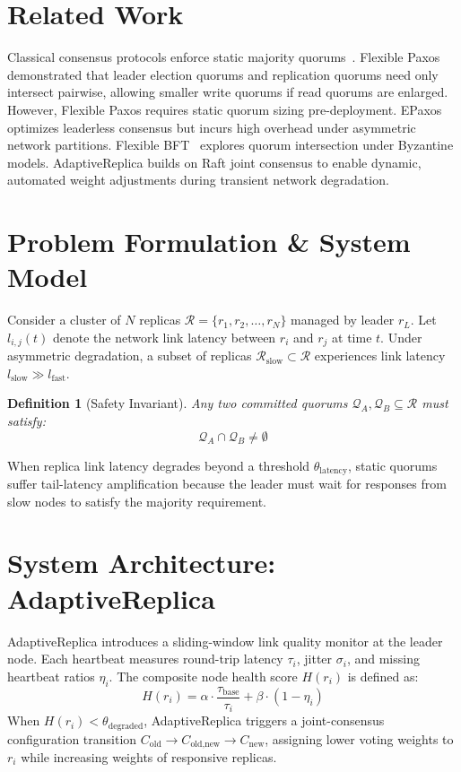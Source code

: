 \documentclass[journal]{IEEEtai}
\newtheorem{definition}{Definition}
\begin{document}
\section{Related Work}
Classical consensus protocols enforce static majority quorums~\cite{lamport1998part, ongaro2014search}. Flexible Paxos~\cite{howard2016flexible} demonstrated that leader election quorums and replication quorums need only intersect pairwise, allowing smaller write quorums if read quorums are enlarged. However, Flexible Paxos requires static quorum sizing pre-deployment. EPaxos~\cite{moraru2013there} optimizes leaderless consensus but incurs high overhead under asymmetric network partitions. Flexible BFT~\cite{malkhi2019flexible} explores quorum intersection under Byzantine models. AdaptiveReplica builds on Raft joint consensus to enable dynamic, automated weight adjustments during transient network degradation.

\section{Problem Formulation \& System Model}
Consider a cluster of $N$ replicas $\mathcal{R} = \{r_1, r_2, \dots, r_N\}$ managed by leader $r_L$. Let $l_{i,j}(t)$ denote the network link latency between $r_i$ and $r_j$ at time $t$. Under asymmetric degradation, a subset of replicas $\mathcal{R}_{\text{slow}} \subset \mathcal{R}$ experiences link latency $l_{\text{slow}} \gg l_{\text{fast}}$.

\begin{definition}[Safety Invariant]
Any two committed quorums $\mathcal{Q}_A, \mathcal{Q}_B \subseteq \mathcal{R}$ must satisfy:
\begin{equation}
\mathcal{Q}_A \cap \mathcal{Q}_B \neq \emptyset
\end{equation}
\end{definition}

When replica link latency degrades beyond a threshold $\theta_{\text{latency}}$, static quorums suffer tail-latency amplification because the leader must wait for responses from slow nodes to satisfy the majority requirement.

\section{System Architecture: AdaptiveReplica}
AdaptiveReplica introduces a sliding-window link quality monitor at the leader node. Each heartbeat measures round-trip latency $\tau_i$, jitter $\sigma_i$, and missing heartbeat ratios $\eta_i$. The composite node health score $H(r_i)$ is defined as:
\begin{equation}
H(r_i) = \alpha \cdot \frac{\tau_{\text{base}}}{\tau_i} + \beta \cdot (1 - \eta_i)
\end{equation}
When $H(r_i) < \theta_{\text{degraded}}$, AdaptiveReplica triggers a joint-consensus configuration transition $C_{\text{old}} \to C_{\text{old}, \text{new}} \to C_{\text{new}}$, assigning lower voting weights to $r_i$ while increasing weights of responsive replicas.
\end{document}
